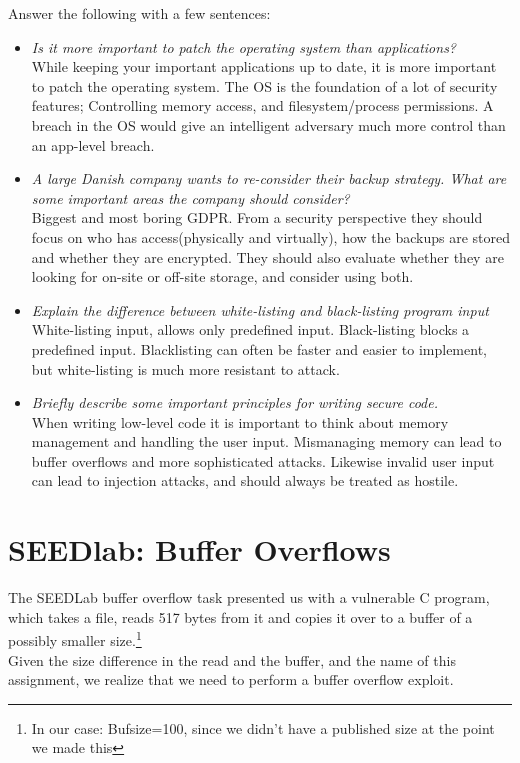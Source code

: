 \documentclass{article}
\begin{document}
Answer the following with a few sentences:
\begin{itemize}
    \item \emph{Is it more important to patch the operating system than applications?}\\
    While keeping your important applications up to date, it is more important to
    patch the operating system. The OS is the foundation of a lot of security features;
    Controlling memory access, and filesystem/process permissions. A breach in the
    OS would give an intelligent adversary much more control than an app-level breach.
    \item \emph{A large Danish company wants to re-consider their backup strategy. What 
    are some important areas the company should consider?}\\
    Biggest and most boring GDPR. From a security perspective they should focus on
    who has access(physically and virtually), how the backups are stored and whether
    they are encrypted. They should also evaluate whether they are looking for on-site
    or off-site storage, and consider using both.
    \item \emph{Explain the difference between white-listing and black-listing program
    input}\\
    White-listing input, allows only predefined input. Black-listing blocks a predefined
    input. Blacklisting can often be faster and easier to implement, but white-listing
    is much more resistant to attack. 
    \item \emph{Briefly describe some important principles for writing secure code.}\\
    When writing low-level code it is important to think about memory management and
    handling the user input. Mismanaging memory can lead to buffer overflows and more
    sophisticated attacks. Likewise invalid user input can lead to injection attacks,
    and should always be treated as hostile.
\end{itemize}
\newpage
\section{SEEDlab: Buffer Overflows}
The SEEDLab buffer overflow task presented us with a vulnerable C program, which
takes a file, reads 517 bytes from it and copies it over to a buffer of a possibly
smaller size.\footnote{In our case: Bufsize=100, since we didn't have a published
size at the point we made this}\\ 
Given the size difference in the read and the buffer, and the name of this assignment,
we realize that we need to perform a buffer overflow exploit. 
\end{document}
